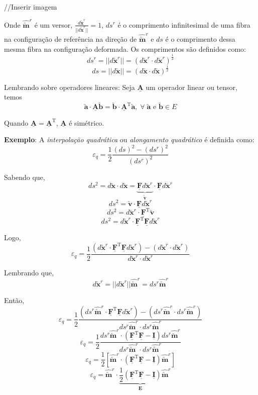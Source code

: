 //Inserir imagem
	
Onde $\hat{\utilde{\mathbf{m}}}^r$ é um versor, $\displaystyle\frac{d\utilde{\mathbf{x}}^r}{||d\utilde{\mathbf{x}}^r||}=1$, $ds^r$ é o comprimento infinitesimal de uma fibra na configuração de referência na direção de $\hat{\utilde{\mathbf{m}}}^r$ e $ds$ é o comprimento dessa mesma fibra na configuração deformada. Os comprimentos são definidos como:
\[ds^r=||d\utilde{\mathbf{x}}^r||=(d\utilde{\mathbf{x}}^r\cdot d\utilde{\mathbf{x}}^r)^{\frac{1}{2}}\]
\[ds=||d\utilde{\mathbf{x}}||=(d\utilde{\mathbf{x}}\cdot d\utilde{\mathbf{x}})^{\frac{1}{2}}\]
	
Lembrando sobre operadores lineares: Seja $\underline{\mathbf{A}}$ um operador linear ou tensor, temos
\[\utilde{\mathbf{a}}\cdot\underline{\mathbf{A}}\utilde{\mathbf{b}}=\utilde{\mathbf{b}}\cdot\underline{\mathbf{A}}^{\text{T}}\utilde{\mathbf{a}},\;\forall\;\mathbf{\utilde{\mathbf{a}}}\text{ e }\mathbf{\utilde{\mathbf{b}}}\in\text{$E$}\]
	
Quando $\underline{\mathbf{A}}=\underline{\mathbf{A}}^{\text{T}}$, $\underline{\mathbf{A}}$ é simétrico.
	
\textbf{Exemplo}: A \textit{interpolação quadrática} ou \textit{alongamento quadrático} é definida como:
\[\varepsilon_q=\frac{1}{2}\frac{(ds)^2-(ds^r)^2}{(ds^r)^2}\]
	
Sabendo que,
\[ds^2=d\utilde{\mathbf{x}}\cdot d\utilde{\mathbf{x}}=\underbrace{\underline{\mathbf{F}}d\utilde{\mathbf{x}}^r}_{\displaystyle\utilde{\mathbf{v}}}\cdot\underline{\mathbf{F}}d\utilde{\mathbf{x}}^r\]
\[ds^2=\utilde{\mathbf{v}}\cdot\underline{\mathbf{F}}d\utilde{\mathbf{x}}^r\]
\[ds^2=d\utilde{\mathbf{x}}^r\cdot\underline{\mathbf{F}}^{\text{T}}\utilde{\mathbf{v}}\]
\[ds^2=d\utilde{\mathbf{x}}^r\cdot\underline{\mathbf{F}}^{\text{T}}\underline{\mathbf{F}}d\utilde{\mathbf{x}}^r\]
	
Logo,
\[\varepsilon_q=\frac{1}{2}\frac{(d\utilde{\mathbf{x}}^r\cdot\underline{\mathbf{F}}^{\text{T}}\underline{\mathbf{F}}d\utilde{\mathbf{x}}^r)-(d\utilde{\mathbf{x}}^r\cdot d\utilde{\mathbf{x}}^r)}{d\utilde{\mathbf{x}}^r\cdot d\utilde{\mathbf{x}}^r}\]
	
Lembrando que,
\[d\utilde{\mathbf{x}}^r=||d\utilde{\mathbf{x}}^r||\hat{\utilde{\mathbf{m}}}^r=ds^r\hat{\utilde{\mathbf{m}}}^r\]
	
Então,
\[\varepsilon_q=\frac{1}{2}\frac{(ds^r\hat{\utilde{\mathbf{m}}}^r\cdot\underline{\mathbf{F}}^{\text{T}}\underline{\mathbf{F}}d\utilde{\mathbf{x}}^r)-(ds^r\hat{\utilde{\mathbf{m}}}^r\cdot ds^r\hat{\utilde{\mathbf{m}}}^r)}{ds^r\hat{\utilde{\mathbf{m}}}^r\cdot ds^r\hat{\utilde{\mathbf{m}}}^r}\]
\[\varepsilon_q=\frac{1}{2}\frac{ds^r\hat{\utilde{\mathbf{m}}}^r\cdot(\underline{\mathbf{F}}^{\text{T}}\underline{\mathbf{F}}-\underline{\mathbf{I}})ds^r\hat{\utilde{\mathbf{m}}}^r}{ds^r\hat{\utilde{\mathbf{m}}}^r\cdot ds^r\hat{\utilde{\mathbf{m}}}^r}\]
\[\varepsilon_q=\frac{1}{2}[\hat{\utilde{\mathbf{m}}}^r\cdot(\underline{\mathbf{F}}^{\text{T}}\underline{\mathbf{F}}-\underline{\mathbf{I}})\hat{\utilde{\mathbf{m}}}^r]\]
\[\varepsilon_q=\hat{\utilde{\mathbf{m}}}^r\cdot\underbrace{\frac{1}{2}(\underline{\mathbf{F}}^{\text{T}}\underline{\mathbf{F}}-\underline{\mathbf{I}})}_{\displaystyle\underline{\mathbf{E}}}\hat{\utilde{\mathbf{m}}}^r\]
	
